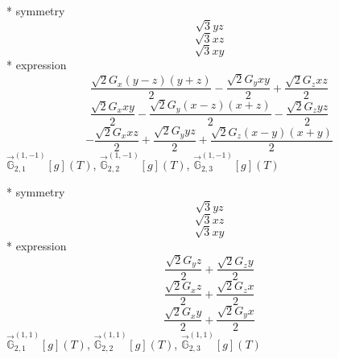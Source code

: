 \documentclass[fleqn,8pt]{jsarticle}
\begin{document}
\noindent\quad ** symmetry
\begin{dmath*}
\sqrt{3} y z
\end{dmath*}
\begin{dmath*}
\sqrt{3} x z
\end{dmath*}
\begin{dmath*}
\sqrt{3} x y
\end{dmath*}
\noindent\quad ** expression
\begin{dmath*}
\frac{\sqrt{2} G_{x} \left(y - z\right) \left(y + z\right)}{2} - \frac{\sqrt{2} G_{y} x y}{2} + \frac{\sqrt{2} G_{z} x z}{2}
\end{dmath*}
\begin{dmath*}
\frac{\sqrt{2} G_{x} x y}{2} - \frac{\sqrt{2} G_{y} \left(x - z\right) \left(x + z\right)}{2} - \frac{\sqrt{2} G_{z} y z}{2}
\end{dmath*}
\begin{dmath*}
- \frac{\sqrt{2} G_{x} x z}{2} + \frac{\sqrt{2} G_{y} y z}{2} + \frac{\sqrt{2} G_{z} \left(x - y\right) \left(x + y\right)}{2}
\end{dmath*}
\noindent\quad $\vec{\mathbb{G}}_{2,1}^{(1,-1)}[g](T)$, $\vec{\mathbb{G}}_{2,2}^{(1,-1)}[g](T)$, $\vec{\mathbb{G}}_{2,3}^{(1,-1)}[g](T)$

\noindent\quad ** symmetry
\begin{dmath*}
\sqrt{3} y z
\end{dmath*}
\begin{dmath*}
\sqrt{3} x z
\end{dmath*}
\begin{dmath*}
\sqrt{3} x y
\end{dmath*}
\noindent\quad ** expression
\begin{dmath*}
\frac{\sqrt{2} G_{y} z}{2} + \frac{\sqrt{2} G_{z} y}{2}
\end{dmath*}
\begin{dmath*}
\frac{\sqrt{2} G_{x} z}{2} + \frac{\sqrt{2} G_{z} x}{2}
\end{dmath*}
\begin{dmath*}
\frac{\sqrt{2} G_{x} y}{2} + \frac{\sqrt{2} G_{y} x}{2}
\end{dmath*}
\noindent\quad $\vec{\mathbb{G}}_{2,1}^{(1,1)}[g](T)$, $\vec{\mathbb{G}}_{2,2}^{(1,1)}[g](T)$, $\vec{\mathbb{G}}_{2,3}^{(1,1)}[g](T)$
\end{document}
